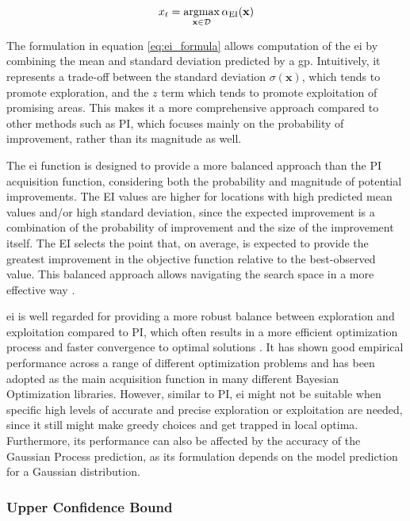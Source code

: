 \[
x_t = \operatorname*{argmax}_{\mathbf{x} \in \mathcal{D}}  \alpha_{\text{EI}}(\mathbf{x})
\]

The formulation in equation \eqref{eq:ei_formula} allows computation of the \ac{ei} by combining the mean and standard deviation predicted by a \ac{gp}. Intuitively, it represents a trade-off between the standard deviation \(\sigma(\mathbf{x})\), which tends to promote exploration, and the \(z\) term which tends to promote exploitation of promising areas. This makes it a more comprehensive approach compared to other methods such as \ac{PI}, which focuses mainly on the probability of improvement, rather than its magnitude as well.

The \ac{ei} function is designed to provide a more balanced approach than the \ac{PI} acquisition function, considering both the probability and magnitude of potential improvements. The EI values are higher for locations with high predicted mean values and/or high standard deviation, since the expected improvement is a combination of the probability of improvement and the size of the improvement itself. The EI selects the point that, on average, is expected to provide the greatest improvement in the objective function relative to the best-observed value. This balanced approach allows navigating the search space in a more effective way \citep{shahriari2015taking}.

\ac{ei} is well regarded for providing a more robust balance between exploration and exploitation compared to \ac{PI}, which often results in a more efficient optimization process and faster convergence to optimal solutions \citep{frazier2018tutorial}. It has shown good empirical performance across a range of different optimization problems and has been adopted as the main acquisition function in many different Bayesian Optimization libraries. However, similar to \ac{PI}, \ac{ei} might not be suitable when specific high levels of accurate and precise exploration or exploitation are needed, since it still might make greedy choices and get trapped in local optima. Furthermore, its performance can also be affected by the accuracy of the Gaussian Process prediction, as its formulation depends on the model prediction for a Gaussian distribution.

\subsubsection{Upper Confidence Bound}
\label{section:ucb}

